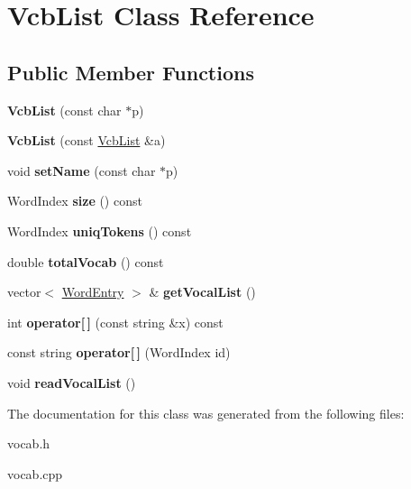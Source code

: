 \hypertarget{classVcbList}{\section{\-Vcb\-List \-Class \-Reference}
\label{classVcbList}
}
\subsection*{\-Public \-Member \-Functions}
\begin{DoxyCompactItemize}
\item 
\hypertarget{classVcbList_a5ab1495ac84e92e1bad35d43f45b518a}{{\bfseries \-Vcb\-List} (const char $\ast$p)}\label{classVcbList_a5ab1495ac84e92e1bad35d43f45b518a}

\item 
\hypertarget{classVcbList_a80b08d6ae82bf70ac4b47f9f5dc09d36}{{\bfseries \-Vcb\-List} (const \hyperlink{classVcbList}{\-Vcb\-List} \&a)}\label{classVcbList_a80b08d6ae82bf70ac4b47f9f5dc09d36}

\item 
\hypertarget{classVcbList_a3a34f43a5e3d71fd2648fe3be0c64001}{void {\bfseries set\-Name} (const char $\ast$p)}\label{classVcbList_a3a34f43a5e3d71fd2648fe3be0c64001}

\item 
\hypertarget{classVcbList_a095d0d4995513e9eb4f42b4026c2d9c6}{\-Word\-Index {\bfseries size} () const }\label{classVcbList_a095d0d4995513e9eb4f42b4026c2d9c6}

\item 
\hypertarget{classVcbList_a3051418aa81303fb0584336905f6b984}{\-Word\-Index {\bfseries uniq\-Tokens} () const }\label{classVcbList_a3051418aa81303fb0584336905f6b984}

\item 
\hypertarget{classVcbList_a660b32ab38b14840fc76281968bb3c0a}{double {\bfseries total\-Vocab} () const }\label{classVcbList_a660b32ab38b14840fc76281968bb3c0a}

\item 
\hypertarget{classVcbList_a15f39978d8b2ac59cd7c8f71cb189de0}{vector$<$ \hyperlink{classWordEntry}{\-Word\-Entry} $>$ \& {\bfseries get\-Vocal\-List} ()}\label{classVcbList_a15f39978d8b2ac59cd7c8f71cb189de0}

\item 
\hypertarget{classVcbList_a48e1c6073621559a3aa6506d2d401d8f}{int {\bfseries operator\mbox{[}$\,$\mbox{]}} (const string \&x) const }\label{classVcbList_a48e1c6073621559a3aa6506d2d401d8f}

\item 
\hypertarget{classVcbList_af278f902e1d40dda89c28f023bee9217}{const string {\bfseries operator\mbox{[}$\,$\mbox{]}} (\-Word\-Index id)}\label{classVcbList_af278f902e1d40dda89c28f023bee9217}

\item 
\hypertarget{classVcbList_ac8530d9ea237a06135e4d5f888685d60}{void {\bfseries read\-Vocal\-List} ()}\label{classVcbList_ac8530d9ea237a06135e4d5f888685d60}

\end{DoxyCompactItemize}


\-The documentation for this class was generated from the following files\-:\begin{DoxyCompactItemize}
\item 
vocab.\-h\item 
vocab.\-cpp\end{DoxyCompactItemize}
